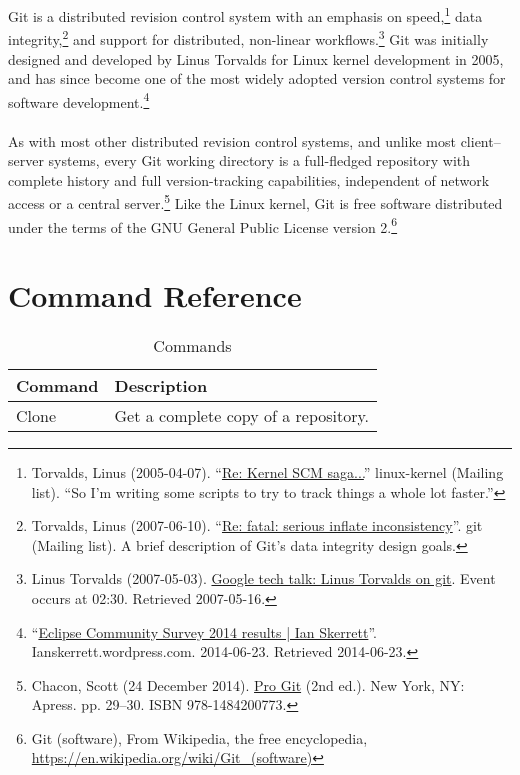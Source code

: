 \documentclass[12pt,letterpaper,dvips]{article}
\begin{document}
Git is a distributed revision control system with an emphasis on
speed,\footnote{ Torvalds, Linus
  (2005-04-07). ``\href{http://marc.info/?l=linux-kernel&m=111288700902396}{Re:
    Kernel SCM saga...}'' linux-kernel (Mailing list). ``So I'm writing some
  scripts to try to track things a whole lot faster.''} data integrity,\footnote{ Torvalds, Linus (2007-06-10). ``\href{http://marc.info/?l=git&m=118143549107708}{Re: fatal: serious inflate inconsistency}''. git (Mailing list). A brief description of Git's data integrity design goals.} and support for distributed, non-linear workflows.\footnote{Linus Torvalds (2007-05-03). \href{https://www.youtube.com/watch?v=4XpnKHJAok8}{Google tech talk: Linus Torvalds on git}. Event occurs at 02:30. Retrieved 2007-05-16.} Git was initially designed and developed by Linus Torvalds for Linux kernel development in 2005, and has since become one of the most widely adopted version control systems for software development.\footnote{ ``\href{http://ianskerrett.wordpress.com/2014/06/23/eclipse-community-survey-2014-results/}{Eclipse Community Survey 2014 results | Ian Skerrett}''. Ianskerrett.wordpress.com. 2014-06-23. Retrieved 2014-06-23.}\\
\\
\noindent As with most other distributed revision control systems,
and unlike most client–server systems, every Git working directory is a
full-fledged repository with complete history and full version-tracking
capabilities, independent of network access or a central
server.\footnote{Chacon, Scott (24
  December 2014). \href{http://git-scm.com/book/en/v2}{Pro Git} (2nd ed.). New
  York, NY: Apress. pp. 29–30. ISBN 978-1484200773.} Like the Linux kernel,
Git is free software distributed under the terms of the GNU General Public
License version 2.\footnote{Git (software), From Wikipedia, the free
encyclopedia, \href{https://en.wikipedia.org/wiki/Git\_(software)}{https://en.wikipedia.org/wiki/Git\_(software)}}


\newpage
\section{Command Reference}

\begin{table}[htb]
\begin{center}
\begin{tabular}{|p{}|p{}|}\hline
Command&Description\\
\hline
Clone&Get a complete copy of a repository.\\
\hline
\end{tabular}
\caption {Commands}
\label{table:commands}
\end{center}
\end{table}
\end{document}
